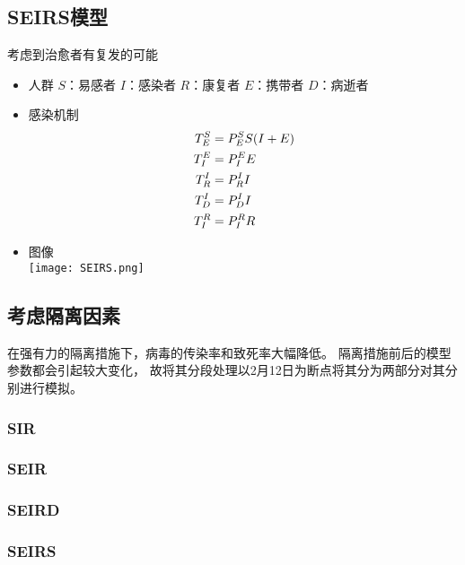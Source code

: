 \subsection{SEIRS模型}
考虑到治愈者有复发的可能
\begin{itemize}
    \item 人群
          \subitem $S$：易感者
          \subitem $I$：感染者
          \subitem $R$：康复者
          \subitem $E$：携带者
          \subitem $D$：病逝者
    \item  感染机制
          \subitem
          \begin{align}
              T^{S}_{E}&=P^{S}_{E}S(I+E) \\
              T^{E}_{I}&=P^{E}_{I}E      \\
              T^{I}_{R}&=P^{I}_{R}I      \\
              T^{I}_{D}&=P^{I}_{D}I      \\
              T^{R}_{I}&=P^{R}_{I}R
          \end{align}
    \item 图像
          \\
          \texttt{[image: SEIRS.png]}
\end{itemize}
\subsection{考虑隔离因素}
\par
在强有力的隔离措施下，病毒的传染率和致死率大幅降低。
隔离措施前后的模型参数都会引起较大变化，
故将其分段处理以2月12日为断点将其分为两部分对其分别进行模拟。
\subsubsection{SIR}
\subsubsection{SEIR}
\subsubsection{SEIRD}
\subsubsection{SEIRS}
